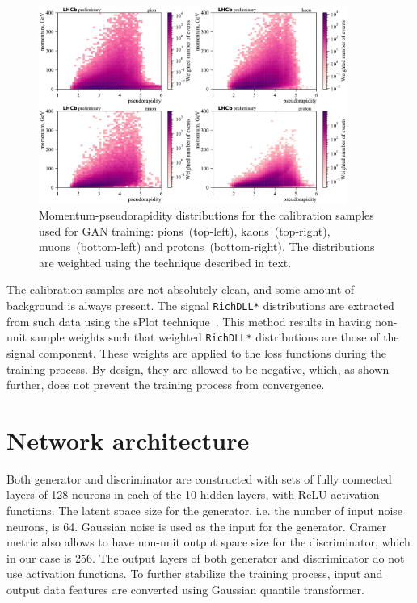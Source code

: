 \documentclass[a4paper]{jpconf}
\begin{document}
\begin{figure}
    \centering
    \includegraphics[width=0.9\textwidth]{P_vs_ETA.pdf}
    \caption{Momentum-pseudorapidity distributions for the calibration samples used for GAN training: pions~(top-left), kaons~(top-right), muons~(bottom-left) and protons~(bottom-right). The distributions are weighted using the technique described in text.}
    \label{fig:P-ETA}
\end{figure}

The calibration samples are not absolutely clean, and some amount of background is always present. The signal \texttt{RichDLL*} distributions are extracted from such data using the sPlot technique~\cite{Pivk:2004ty}. This method results in having non-unit sample weights such that weighted \texttt{RichDLL*} distributions are those of the signal component. These weights are applied to the loss functions during the training process. By design, they are allowed to be negative, which, as shown further, does not prevent the training process from convergence.

\section{Network architecture}

Both generator and discriminator are constructed with sets of fully connected layers of 128 neurons in each of the 10 hidden layers, with ReLU activation functions. The latent space size for the generator, i.e. the number of input noise neurons, is 64. Gaussian noise is used as the input for the generator. Cramer metric also allows to have non-unit output space size for the discriminator, which in our case is 256. The output layers of both generator and discriminator do not use activation functions. To further stabilize the training process, input and output data features are converted using Gaussian quantile transformer.
\end{document}
